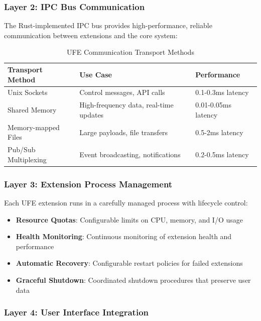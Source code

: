 \subsubsection{Layer 2: IPC Bus Communication}

The Rust-implemented IPC bus provides high-performance, reliable communication between extensions and the core system:

\begin{table}[ht]
\centering
\begin{tabular}{@{}lll@{}}
\toprule
\textbf{Transport Method} & \textbf{Use Case} & \textbf{Performance} \\
\midrule
Unix Sockets & Control messages, API calls & 0.1-0.3ms latency \\
Shared Memory & High-frequency data, real-time updates & 0.01-0.05ms latency \\
Memory-mapped Files & Large payloads, file transfers & 0.5-2ms latency \\
Pub/Sub Multiplexing & Event broadcasting, notifications & 0.2-0.5ms latency \\
\bottomrule
\end{tabular}
\caption{UFE Communication Transport Methods}
\label{tab:ufe-transport}
\end{table}

\subsubsection{Layer 3: Extension Process Management}

Each UFE extension runs in a carefully managed process with lifecycle control:

\begin{itemize}
    \item \textbf{Resource Quotas}: Configurable limits on CPU, memory, and I/O usage
    \item \textbf{Health Monitoring}: Continuous monitoring of extension health and performance
    \item \textbf{Automatic Recovery}: Configurable restart policies for failed extensions
    \item \textbf{Graceful Shutdown}: Coordinated shutdown procedures that preserve user data
\end{itemize}

\subsubsection{Layer 4: User Interface Integration}

